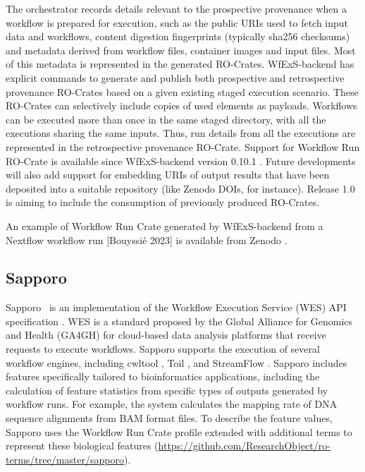 \documentclass[10pt,letterpaper]{article}
\begin{document}
The orchestrator records details relevant to the prospective provenance when a workflow is prepared for execution, such as the public URIs used to fetch input data and workflows, content digestion fingerprints (typically sha256 checksums) and metadata derived from workflow files, container images and input files.
Most of this metadata is represented in the generated RO-Crates. WfExS-backend has explicit commands to generate and publish both prospective and retrospective provenance RO-Crates based on a given existing staged execution scenario.
These RO-Crates can selectively include copies of used elements as payloads.
Workflows can be executed more than once in the same staged directory, with all the executions sharing the same inputs.
Thus, run details from all the executions are represented in the retrospective provenance RO-Crate. Support for Workflow Run RO-Crate is available since WfExS-backend version 0.10.1 \cite{Fernández 2023a}.
Future developments will also add support for embedding URIs of output results that have been deposited into a suitable repository (like Zenodo DOIs, for instance).
Release 1.0 is aiming to include the consumption of previously produced RO-Crates.

An example of Workflow Run Crate generated by WfExS-backend from a Nextflow workflow run [Bouyssié 2023] is available from Zenodo \cite{Fernández 2023b}.


\subsection{Sapporo}\label{sapporo}

Sapporo~\cite{Suetake 2022a} is an implementation of the Workflow Execution Service (WES) API specification \cite{Magee 2018}.
WES is a standard proposed by the Global Alliance for Genomics and Health (GA4GH) for cloud-based data analysis platforms that receive requests to execute workflows.
Sapporo supports the execution of several workflow engines, including cwltool \cite{Amstutz 2023}, Toil \cite{Vivian 2017}, and StreamFlow \cite{Colonnelli 2020}.
Sapporo includes features specifically tailored to bioinformatics applications, including the calculation of feature statistics from specific types of outputs generated by workflow runs.
For example, the system calculates the mapping rate of DNA sequence alignments from BAM format files.
To describe the feature values, Sapporo uses the Workflow Run Crate profile extended with additional terms to represent these biological features (\url{https://github.com/ResearchObject/ro-terms/tree/master/sapporo}).
\end{document}
